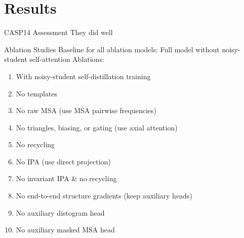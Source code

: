 \documentclass[presentation, smaller]{beamer}
\begin{document}
\section*{Results}
\label{sec:org7c7a457}
\begin{frame}[label={sec:org2d131a6}]{CASP14 Assessment \cite{jumperHighlyAccurateProtein2021}}
They did well
\end{frame}
\begin{frame}[label={sec:org5d63886}]{Ablation Studies \cite{jumperHighlyAccurateProtein2021}}
Baseline for all ablation models: Full model without noisy-student self-attention  
Ablations:
\begin{enumerate}
\item With noisy-student self-distillation training
\item No templates
\item No raw MSA (use MSA pairwise frequencies)
\item No triangles, biasing, or gating (use axial attention)
\item No recycling
\item No IPA (use direct projection)
\item No invariant IPA \& no recycling
\item No end-to-end structure gradients (keep auxiliary heads)
\item No auxiliary distogram head
\item No auxiliary masked MSA head
\end{enumerate}
\end{frame}
\end{document}
